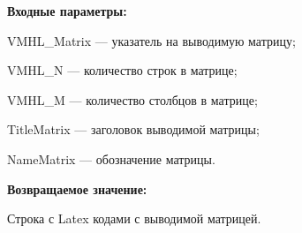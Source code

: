 \textbf{Входные параметры:}
 

VMHL\_Matrix --- указатель на выводимую матрицу;
 
    VMHL\_N --- количество строк в матрице;
 
    VMHL\_M --- количество столбцов в матрице;
 
    TitleMatrix --- заголовок выводимой матрицы;
 
    NameMatrix --- обозначение матрицы.
	
\textbf{Возвращаемое значение:}

Строка с Latex кодами с выводимой матрицей.